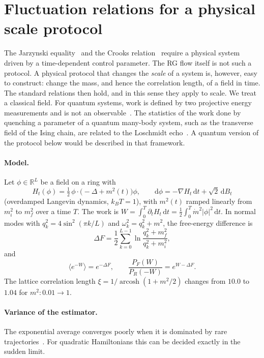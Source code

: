 \documentclass[11pt]{article}
\theoremstyle{remark}\newtheorem*{remark}{Remark}
\newcommand{\dd}{\mathrm{d}}
\newcommand{\RR}{\mathbb{R}}
\begin{document}
\section{Fluctuation relations for a physical scale protocol}
\label{sec:jarzynski}

The Jarzynski equality~\cite{Jarzynski97} and the Crooks relation~\cite{Crooks} require a physical system driven
by a time-dependent control parameter. The RG flow itself is not such a protocol. A physical protocol that changes
the \emph{scale} of a system is, however, easy to construct: change the mass, and hence the correlation length, of
a field in time. The standard relations then hold, and in this sense they apply to scale. We treat a classical
field. For quantum systems, work is defined by two projective energy measurements and is not an
observable~\cite{TLH}. The statistics of the work done by quenching a parameter of a quantum many-body system, such
as the transverse field of the Ising chain, are related to the Loschmidt echo~\cite{Silva}. A quantum version of the
protocol below would be described in that framework.

\paragraph{Model.}
Let $\phi\in\RR^L$ be a field on a ring with
\begin{equation}
H_t(\phi)=\tfrac12\,\phi\cdot\bigl(-\Delta+m^2(t)\bigr)\phi,\qquad
\dd\phi=-\nabla H_t\,\dd t+\sqrt2\,\dd B_t
\label{eq:langevin}
\end{equation}
(overdamped Langevin dynamics, $k_BT=1$), with $m^2(t)$ ramped linearly from $m_i^2$ to $m_f^2$ over a time $T$.
The work is $W=\int_0^T\partial_tH_t\,\dd t=\tfrac12\int_0^T\dot{m}^2|\phi|^2\,\dd t$. In normal modes with
$q_k^2=4\sin^2(\pi k/L)$ and $\omega_k^2=q_k^2+m^2$, the free-energy difference is
\begin{equation}
\Delta F=\frac12\sum_{k=0}^{L-1}\ln\frac{q_k^2+m_f^2}{q_k^2+m_i^2},
\label{eq:dF}
\end{equation}
and
\begin{equation}
\langle e^{-W}\rangle=e^{-\Delta F},\qquad
\frac{P_F(W)}{P_R(-W)}=e^{W-\Delta F}.
\label{eq:jc}
\end{equation}
The lattice correlation length $\xi=1/\operatorname{arcosh}(1+m^2/2)$ changes from $10.0$ to $1.04$ for
$m^2:0.01\to1$.

\paragraph{Variance of the estimator.}
The exponential average converges poorly when it is dominated by rare trajectories~\cite{Jarzynski2006}. For
quadratic Hamiltonians this can be decided exactly in the sudden limit.
\end{document}
